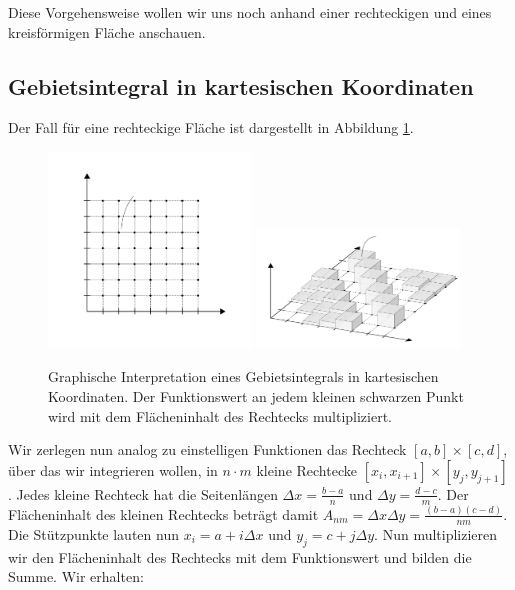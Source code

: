 Diese Vorgehensweise wollen wir uns noch anhand einer rechteckigen und eines kreisförmigen Fläche anschauen.

\subsection{Gebietsintegral in kartesischen Koordinaten}


Der Fall für eine rechteckige Fläche ist dargestellt in Abbildung \ref{fig:AreaIntegCartesian}.

\begin{figure}
    \centering
    \includegraphics[width=0.48\textwidth]{./svg/integral-2d-cartesian}
    \includegraphics[width=0.48\textwidth]{./svg/integral-2d-cartesian-perspective}
    \caption[Gebietsintegral in kartesischen Koordinaten]{Graphische Interpretation eines Gebietsintegrals in kartesischen Koordinaten. Der Funktionswert an jedem kleinen schwarzen Punkt wird mit dem Flächeninhalt des Rechtecks multipliziert.}
    \label{fig:AreaIntegCartesian}
\end{figure}

Wir zerlegen nun analog zu einstelligen Funktionen das Rechteck $[a,b] \times [c,d]$, über das wir integrieren wollen, in $n\cdot m $ kleine Rechtecke $[x_i,x_{i+1}] \times [y_j,y_{j+1}]$. Jedes kleine Rechteck hat die Seitenlängen $\Delta x = \frac{b-a}{n}$ und $\Delta y = \frac{d-c}{m}$. Der Flächeninhalt des kleinen Rechtecks beträgt damit $A_{nm} = \Delta x \Delta y = \frac{(b-a)(c-d)}{nm}$. Die Stützpunkte lauten nun $x_i = a + i \Delta x$ und $y_j = c + j \Delta y$.  Nun multiplizieren wir den Flächeninhalt des Rechtecks mit dem Funktionswert und bilden die Summe. Wir erhalten:

